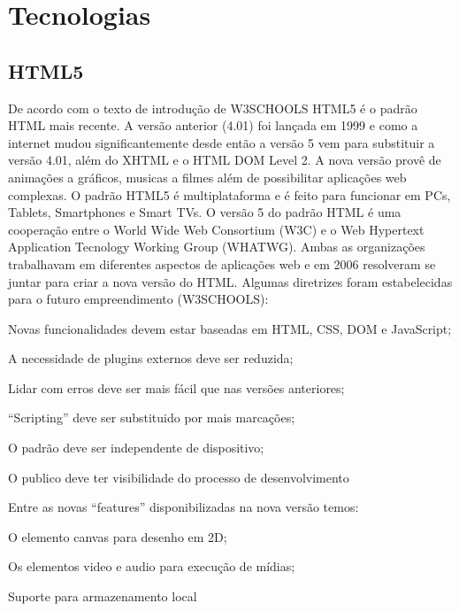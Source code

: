\part{Tecnologias}

\chapter{HTML5}
De acordo com o texto de introdução de W3SCHOOLS HTML5 é o padrão HTML mais recente. A versão anterior (4.01) foi lançada em 1999 e como a internet mudou significantemente desde então a versão 5 vem para substituir a versão 4.01, além do XHTML e o HTML DOM Level 2. A nova versão provê de animações a gráficos, musicas a filmes além de possibilitar aplicações web complexas. O padrão HTML5 é multiplataforma e é feito para funcionar em PCs, Tablets, Smartphones e Smart TVs.
	O versão 5 do padrão HTML é uma cooperação entre o World Wide Web Consortium (W3C) e o Web Hypertext Application Tecnology Working Group (WHATWG). Ambas as organizações trabalhavam em diferentes aspectos de aplicações web e em 2006 resolveram se juntar para criar a nova versão do HTML. Algumas diretrizes foram estabelecidas para o futuro empreendimento (W3SCHOOLS):

Novas funcionalidades devem estar baseadas em HTML, CSS, DOM e JavaScript;

A necessidade de plugins externos deve ser reduzida;

Lidar com erros deve ser mais fácil que nas versões anteriores;

“Scripting” deve ser substituido por mais marcações;

O padrão deve ser independente de dispositivo;

O publico deve ter visibilidade do processo de desenvolvimento

Entre as novas “features” disponibilizadas na nova versão temos:

O elemento canvas para desenho em 2D;

Os elementos video e audio para execução de mídias;

Suporte para armazenamento local
